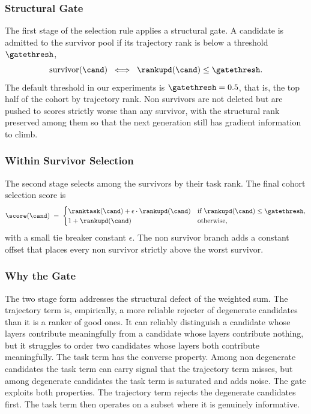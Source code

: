 \subsubsection{Structural Gate}

The first stage of the selection rule applies a structural gate. A candidate is admitted to the survivor pool if its trajectory rank is below a threshold $\gatethresh$,
\begin{equation}
\text{survivor}(\cand) \;\iff\; \rankupd(\cand) \le \gatethresh.
\end{equation}
The default threshold in our experiments is $\gatethresh = 0.5$, that is, the top half of the cohort by trajectory rank. Non survivors are not deleted but are pushed to scores strictly worse than any survivor, with the structural rank preserved among them so that the next generation still has gradient information to climb.

\subsubsection{Within Survivor Selection}

The second stage selects among the survivors by their task rank. The final cohort selection score is
\begin{equation}
\score(\cand) \;=\;
\begin{cases}
\ranktask(\cand) + \epsilon \cdot \rankupd(\cand) & \text{if } \rankupd(\cand) \le \gatethresh, \\
1 + \rankupd(\cand) & \text{otherwise,}
\end{cases}
\label{eq:final_score}
\end{equation}
with a small tie breaker constant $\epsilon$. The non survivor branch adds a constant offset that places every non survivor strictly above the worst survivor.

\subsubsection{Why the Gate}

The two stage form addresses the structural defect of the weighted sum. The trajectory term is, empirically, a more reliable rejecter of degenerate candidates than it is a ranker of good ones. It can reliably distinguish a candidate whose layers contribute meaningfully from a candidate whose layers contribute nothing, but it struggles to order two candidates whose layers both contribute meaningfully. The task term has the converse property. Among non degenerate candidates the task term can carry signal that the trajectory term misses, but among degenerate candidates the task term is saturated and adds noise. The gate exploits both properties. The trajectory term rejects the degenerate candidates first. The task term then operates on a subset where it is genuinely informative.

